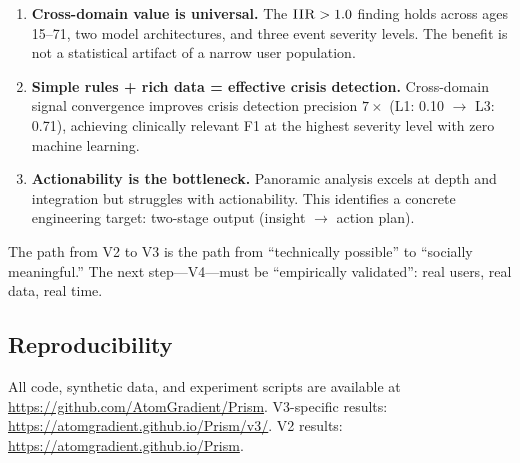 \documentclass[11pt,a4paper]{article}
\newcommand{\iir}{\textsc{IIR}}
\begin{document}
\begin{enumerate}[leftmargin=*,itemsep=2pt]
  \item \textbf{Cross-domain value is universal.} The $\iir{} > 1.0$ finding
    holds across ages 15--71, two model architectures, and three event
    severity levels. The benefit is not a statistical artifact of a narrow
    user population.

  \item \textbf{Simple rules + rich data = effective crisis detection.}
    Cross-domain signal convergence improves crisis detection precision
    $7\times$ (L1: 0.10 $\to$ L3: 0.71), achieving clinically relevant
    F1 at the highest severity level with zero machine learning.

  \item \textbf{Actionability is the bottleneck.} Panoramic analysis excels at
    depth and integration but struggles with actionability. This identifies a
    concrete engineering target: two-stage output (insight $\to$ action plan).
\end{enumerate}

The path from V2 to V3 is the path from ``technically possible'' to
``socially meaningful.'' The next step---V4---must be ``empirically
validated'': real users, real data, real time.

\subsection*{Reproducibility}

All code, synthetic data, and experiment scripts are available at
\url{https://github.com/AtomGradient/Prism}.
V3-specific results: \url{https://atomgradient.github.io/Prism/v3/}.
V2 results: \url{https://atomgradient.github.io/Prism}.


\end{document}
